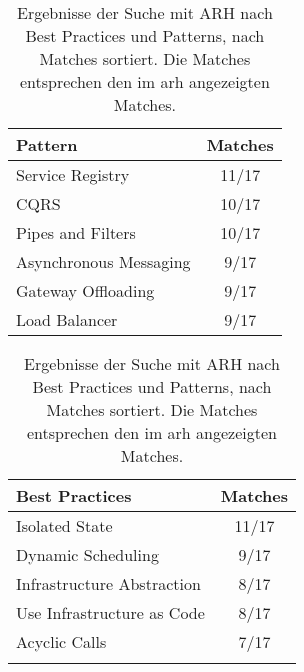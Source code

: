 \begin{table}[!htb]
  \begin{minipage}{.5\linewidth}
    \centering
    \begin{tabular}{l c}
      \toprule
      \textbf{Pattern} & \textbf{Matches} \\ \midrule
      Service Registry       & 11/17 \\ \hline
      CQRS                   & 10/17 \\ \hline
      Pipes and Filters      & 10/17 \\ \hline
      Asynchronous Messaging & 9/17 \\ \hline
      Gateway Offloading     & 9/17 \\ \hline
      Load Balancer          & 9/17 \\ \bottomrule
    \end{tabular}
  \end{minipage}%
  \begin{minipage}{.5\linewidth}
    \centering
    \begin{tabular}{l c}
      \toprule
      \textbf{Best Practices} & \textbf{Matches} \\ \midrule
      Isolated State             & 11/17 \\ \hline
      Dynamic Scheduling         & 9/17 \\ \hline
      Infrastructure Abstraction & 8/17 \\ \hline
      Use Infrastructure as Code & 8/17 \\ \hline
      Acyclic Calls              & 7/17 \\ \bottomrule
      \\
    \end{tabular}
  \end{minipage}

  \caption[Ergebnisse der Suche mit ARH nach Best Practices und Patterns]{
		Ergebnisse der Suche mit ARH nach Best Practices und Patterns, nach Matches sortiert.
		Die Matches entsprechen den im \gls{arh} angezeigten Matches.
	}
	\label{tab:phase3-search-results}
\end{table}
